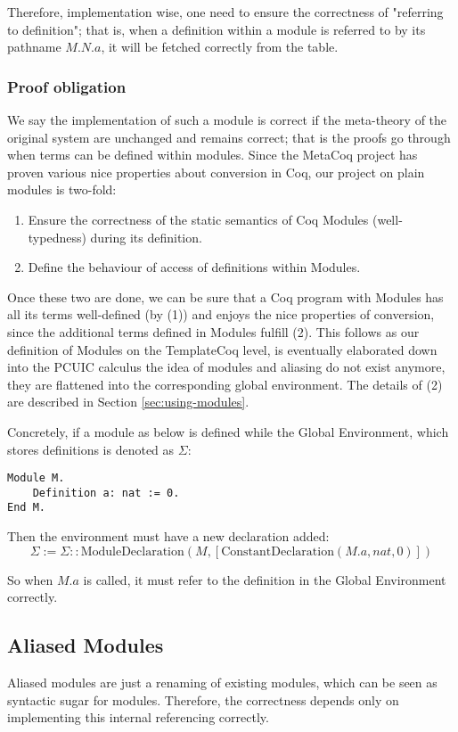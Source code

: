 Therefore, implementation wise, one need to ensure the correctness of "referring
to definition"; that is, when a definition within a module is referred to by its
pathname $M.N.a$, it will be fetched correctly from the table.

\subsubsection{Proof obligation}

We say the implementation of such a module is correct if the meta-theory of the
original system are unchanged and remains correct; that is the proofs go through
when terms can be defined within modules. Since the MetaCoq project has proven
various nice properties about conversion in Coq, our project on plain modules is
two-fold:

\begin{enumerate}
\item Ensure the correctness of the static semantics of Coq Modules
(well-typedness) during its definition.
\item Define the behaviour of access of definitions within Modules.
\end{enumerate}

Once these two are done, we can be sure that a Coq program with Modules
has all its terms well-defined (by (1)) and enjoys the nice properties of
conversion, since the additional terms defined in Modules fulfill (2).
This follows as our definition of Modules on the TemplateCoq level, is
eventually elaborated down into the PCUIC calculus the idea of modules and
aliasing do not exist anymore, they are flattened into the corresponding global
environment. The details of (2) are described in Section \ref{sec:using-modules}.

Concretely, if a module as below is defined while the Global Environment, which
stores definitions is denoted as $\Sigma$:
\begin{verbatim}
Module M.
    Definition a: nat := 0.
End M.
\end{verbatim}
Then the environment must have a new declaration added:
\[\Sigma := \Sigma :: \text{ModuleDeclaration}(M,
[\text{ConstantDeclaration}(M.a, nat, 0)])\]

So when $M.a$ is called, it must refer to the definition in the Global
Environment correctly.

\subsection{Aliased Modules}
Aliased modules are just a renaming of existing modules, which can be seen as
syntactic sugar for modules. Therefore, the correctness depends only on
implementing this internal referencing correctly.

